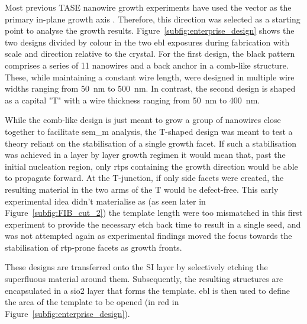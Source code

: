 Most previous \acs{TASE} nanowire growth experiments have used the  vector as the primary in-plane growth axis \cite{Brunelli2019, Knoedler2017, Borg2017, Schmid2015}. Therefore, this direction was selected as a starting point to analyse the growth results. Figure~\ref{subfig:enterprise_design} shows the two designs divided by colour in the two \acf{ebl} exposures during fabrication with scale and direction relative to the crystal. For the first design, the black pattern comprises a series of \num{11} nanowires and a back anchor in a comb-like structure. These, while maintaining a constant wire length, were designed in multiple wire widths ranging from \qty{50}{\nano\metre} to \qty{500}{\nano\metre}. In contrast, the second design is shaped as a capital "T" with a wire thickness ranging from \qty{50}{\nano\metre} to \qty{400}{\nano\metre}. 

While the comb-like design is just meant to grow a group of nanowires close together to facilitate \acf{sem_m} analysis, the T-shaped design was meant to test a theory reliant on the stabilisation of a single  growth facet. If such a stabilisation was achieved in a layer by layer growth regimen it would mean that, past the initial nucleation region, only \acs{rtp}s containing the growth direction would be able to propagate forward. At the T-junction, if only  side facets were created, the resulting material in the two arms of the T would be defect-free. This early experimental idea didn't materialise as (as seen later in Figure~\ref{subfig:FIB_cut_2}) the template length were too mismatched in this first experiment to provide the necessary etch back time to result in a single seed, and was not attempted again as experimental findings moved the focus towards the stabilisation of \acs{rtp}-prone  facets as growth fronts.

These designs are transferred onto the \acl{SI} layer by selectively etching the superfluous material around them. Subsequently, the resulting structures are encapsulated in a \acs{sio2} layer that forms the template. \acs{ebl} is then used to define the area of the template to be opened (in red in Figure~\ref{subfig:enterprise_design}).

